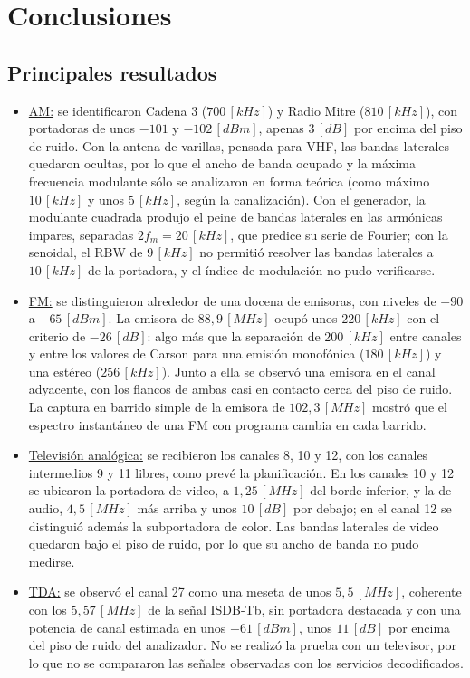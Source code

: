 \section{Conclusiones}
\label{sec:conclusiones}

\subsection{Principales resultados}
\begin{itemize}
    \item \underline{AM:} se identificaron Cadena 3 ($700 \, [kHz]$) y Radio Mitre ($810 \, [kHz]$), con portadoras de unos $-101$ y $-102 \, [dBm]$, apenas $3 \, [dB]$ por encima del piso de ruido. Con la antena de varillas, pensada para VHF, las bandas laterales quedaron ocultas, por lo que el ancho de banda ocupado y la máxima frecuencia modulante sólo se analizaron en forma teórica (como máximo $10 \, [kHz]$ y unos $5 \, [kHz]$, según la canalización). Con el generador, la modulante cuadrada produjo el peine de bandas laterales en las armónicas impares, separadas $2 f_m = 20 \, [kHz]$, que predice su serie de Fourier; con la senoidal, el RBW de $9 \, [kHz]$ no permitió resolver las bandas laterales a $10 \, [kHz]$ de la portadora, y el índice de modulación no pudo verificarse.
    \item \underline{FM:} se distinguieron alrededor de una docena de emisoras, con niveles de $-90$ a $-65 \, [dBm]$. La emisora de $88{,}9 \, [MHz]$ ocupó unos $220 \, [kHz]$ con el criterio de $-26 \, [dB]$: algo más que la separación de $200 \, [kHz]$ entre canales y entre los valores de Carson para una emisión monofónica ($180 \, [kHz]$) y una estéreo ($256 \, [kHz]$). Junto a ella se observó una emisora en el canal adyacente, con los flancos de ambas casi en contacto cerca del piso de ruido. La captura en barrido simple de la emisora de $102{,}3 \, [MHz]$ mostró que el espectro instantáneo de una FM con programa cambia en cada barrido.
    \item \underline{Televisión analógica:} se recibieron los canales 8, 10 y 12, con los canales intermedios 9 y 11 libres, como prevé la planificación. En los canales 10 y 12 se ubicaron la portadora de video, a $1{,}25 \, [MHz]$ del borde inferior, y la de audio, $4{,}5 \, [MHz]$ más arriba y unos $10 \, [dB]$ por debajo; en el canal 12 se distinguió además la subportadora de color. Las bandas laterales de video quedaron bajo el piso de ruido, por lo que su ancho de banda no pudo medirse.
    \item \underline{TDA:} se observó el canal 27 como una meseta de unos $5{,}5 \, [MHz]$, coherente con los $5{,}57 \, [MHz]$ de la señal ISDB-Tb, sin portadora destacada y con una potencia de canal estimada en unos $-61 \, [dBm]$, unos $11 \, [dB]$ por encima del piso de ruido del analizador. No se realizó la prueba con un televisor, por lo que no se compararon las señales observadas con los servicios decodificados.

\end{itemize}
